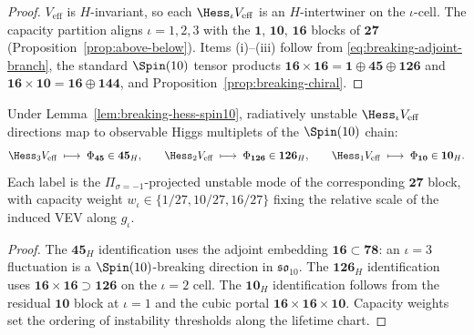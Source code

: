 \begin{proof}
$V_{\mathrm{eff}}$ is $H$-invariant, so each $\Hess_\iota V_{\mathrm{eff}}$ is
an $H$-intertwiner on the $\iota$-cell. The capacity partition aligns
$\iota=1,2,3$ with the $\mathbf{1}$, $\mathbf{10}$, $\mathbf{16}$ blocks of
$\mathbf{27}$ (Proposition~\ref{prop:above-below}). Items (i)--(iii) follow
from \eqref{eq:breaking-adjoint-branch}, the standard $\Spin(10)$ tensor
products $\mathbf{16}\times\mathbf{16}=\mathbf{1}\oplus\mathbf{45}\oplus
\mathbf{126}$ and $\mathbf{16}\times\mathbf{10}=\mathbf{16}\oplus\mathbf{144}$,
and Proposition~\ref{prop:breaking-chiral}.
\end{proof}

\begin{proposition}
\label{prop:breaking-higgs-labels}
Under Lemma~\ref{lem:breaking-hess-spin10}, radiatively unstable
$\Hess_\iota V_{\mathrm{eff}}$ directions map to observable Higgs multiplets
of the $\Spin(10)$ chain:
\begin{equation}\label{eq:breaking-higgs-map}
  \Hess_3 V_{\mathrm{eff}}\;\longmapsto\;\Phi_{\mathbf{45}}\in\mathbf{45}_H,
  \qquad
  \Hess_2 V_{\mathrm{eff}}\;\longmapsto\;\Phi_{\mathbf{126}}\in\mathbf{126}_H,
  \qquad
  \Hess_1 V_{\mathrm{eff}}\;\longmapsto\;\Phi_{\mathbf{10}}\in\mathbf{10}_H.
\end{equation}
Each label is the $\Pi_{\sigma=-1}$-projected unstable mode of the
corresponding $\mathbf{27}$ block, with capacity weight
$w_\iota\in\{1/27,10/27,16/27\}$ fixing the relative scale of the induced
VEV along $g_\iota$.
\end{proposition}

\begin{proof}
The $\mathbf{45}_H$ identification uses the adjoint embedding
$\mathbf{16}\subset\mathbf{78}$: an $\iota=3$ fluctuation is a
$\Spin(10)$-breaking direction in $\mathfrak{so}_{10}$. The $\mathbf{126}_H$
identification uses $\mathbf{16}\times\mathbf{16}\supset\mathbf{126}$ on the
$\iota=2$ cell. The $\mathbf{10}_H$ identification follows from the residual
$\mathbf{10}$ block at $\iota=1$ and the cubic portal
$\mathbf{16}\times\mathbf{16}\times\mathbf{10}$. Capacity weights set the
ordering of instability thresholds along the lifetime chart.
\end{proof}


